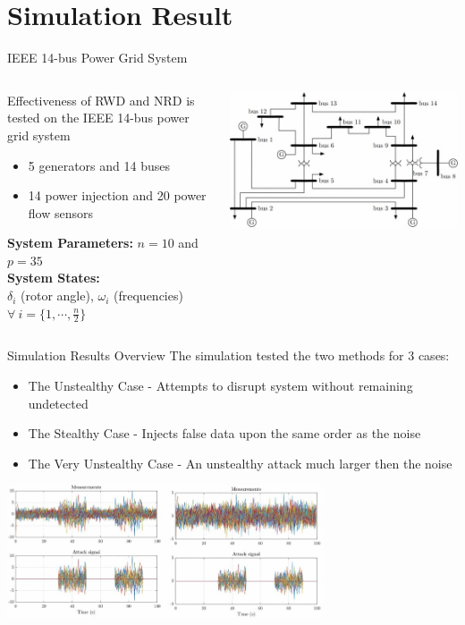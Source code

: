 \documentclass[aspectratio=169]{beamer}
\begin{document}
\section{Simulation Result}
\begin{frame}{IEEE 14-bus Power Grid System \cite{CyberPhysicalAttacksOnPowerNetworks}}
	\begin{columns}
		\begin{column}{0.55\textwidth}
			Effectiveness of RWD and NRD is tested on the IEEE 14-bus power grid system
			\begin{itemize}
				\item 5 generators and 14 buses
				\item 14 power injection and 20 power flow sensors
			\end{itemize}
			\textbf{System Parameters:} $n = 10$ and $p = 35$\\
			\textbf{System States:}\\ $\delta_i$ (rotor angle), $\omega_i$ (frequencies) $\forall \ i = \{1,\cdots, \frac{n}{2}\}$
		\end{column}
		\begin{column}{0.45\textwidth}
			\includegraphics[width=\columnwidth]{Images/Simulation_Power_Grid}
		\end{column}
	\end{columns}
\end{frame}
\begin{frame}{Simulation Results Overview}
	The simulation tested the two methods for 3 cases:
	\begin{itemize}
		\item The Unstealthy Case - Attempts to disrupt system without remaining undetected
		\item The Stealthy Case - Injects false data upon the same order as the noise
		\item The Very Unstealthy Case - An unstealthy attack much larger then the noise
	\end{itemize}
	\centering
	\includegraphics[width=0.7\textwidth]{Images/Sim_Measurment_Comparrision}
\end{frame}
\end{document}
